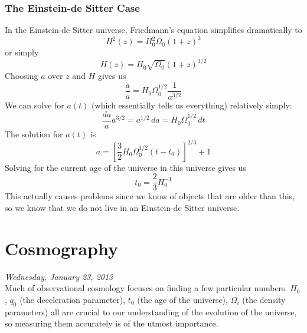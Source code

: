 \documentclass[10pt]{article}
\numberwithin{equation}{section}
\newcommand{\n}{\noindent}
\begin{document}
		\subsubsection{The Einstein-de Sitter Case} %
		\label{ssub:the_einstein_de_sitter_case}
			In the Einstein-de Sitter universe, Friedmann's equation simplifies dramatically to
			\begin{equation}
				\label{eq:dynamics:20} H^2(z) = H_0^2\Omega_0(1+z)^3
			\end{equation}
			or simply
			\begin{equation}
				\label{eq:dynamics:21} H(z) = H_0\sqrt{\Omega_0}(1+z)^{3/2}
			\end{equation}
			Choosing $a$ over $z$ and $H$ gives us
			\begin{equation}
				\label{eq:dynamics:22} \frac{\dot{a}}{a} = H_0\Omega_0^{1/2}\frac{1}{a^{3/2}}
			\end{equation}
			We can solve for $a(t)$ (which essentially tells us everything) relatively simply:
			\begin{equation}
				\label{eq:dynamics:23} \frac{da}{a}a^{3/2} = a^{1/2}\,da = H_0\Omega_0^{1/2}\,dt
			\end{equation}
			The solution for $a(t)$ is
			\begin{equation}
				\label{eq:dynamics:24} a = \left[\frac{3}{2}H_0 \Omega_0^{1/2}(t-t_0)\right]^{2/3}+1
			\end{equation}
			Solving for the current age of the universe in this universe gives us
			\begin{equation}
				\label{eq:dynamics:25} t_0 = \frac{2}{3}H_0^{-1}
			\end{equation}
			This actually causes problems since we know of objects that are older than this, so we know that we do not live in an Einstein-de Sitter universe.\\
\section{Cosmography} %
\label{sec:cosmography}
\n \textit{Wednesday, January 23, 2013}\\

	\n Much of observational cosmology focuses on finding a few particular numbers. $H_0$, $q_0$ (the deceleration parameter), $t_0$ (the age of the universe), $\Omega_i$ (the density parameters) all are crucial to our understanding of the evolution of the universe, so measuring them accurately is of the utmost importance. 
\end{document}
